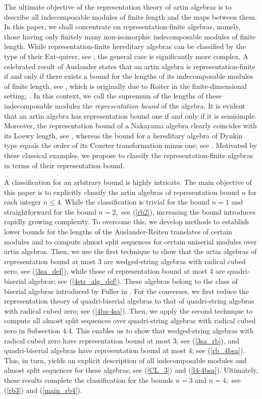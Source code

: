 \documentclass[10pt]{amsart}
\theoremstyle{definition}
\begin{document}
The ultimate objective of the representation theory of artin algebras is to describe all indecomposable modules of finite length and the maps between them. In this paper, we shall concentrate on representation-finite algebras, namely, those having only finitely many non-isomorphic indecomposable modules of finite length. While representation-finite hereditary algebras can be classified by the type of their Ext-quiver, see \cite{DR, Gab, LiT, PAu}, the general case is significantly more complex. A celebrated result of Auslander states that an artin algebra is representation-finite if and only if there exists a bound for the lengths of its indecomposable modules of finite length, see \cite{Aus}, which is originally due to Roiter in the finite-dimensional setting; \cite{Roi}. In this context, we call the supremum of the lengths of these indecomposable modules the {\it representation bound} of the algebra. It is evident that an artin algebra has representation bound one if and only if it is semisimple. Moreover, the representation bound of a Nakayama algebra clearly coincides with its Loewy length, see \cite{Nak}, whereas the bound for a hereditary algebra of Dynkin type equals the order of its Coxeter transformation minus one; see \cite[(4.9)]{Zac}. Motivated by these classical examples, we propose to classify the representation-finite algebras in terms of their representation bound. 

A classification for an arbitrary bound is highly intricate. The main objective of this paper is to explicitly classify the artin algebras of representation bound $n$ for each integer $n \le 4$. While the classification  is trivial for the bound $n=1$ and straightforward for the bound $n=2,$ see (\ref{rb2}), increasing the bound introduces rapidly growing complexity. To overcome this, we develop methods to establish lower bounds for the lengths of the Auslander-Reiten translates of certain modules and to compute almost split sequences for certain uniserial modules over artin algebras. Then, we use the first technique to show that the artin algebras of representation bound at most $3$ are wedged-string algebras with radical cubed zero, see (\ref{3sa_def}), while those of representation bound at most $4$ are quadri-biserial algebras; see (\ref{4str_alg_def}). These algebras belong to the class of biserial algebras introduced by Fuller in \cite{Ful}. For the converses, we first reduce the representation theory of quadri-biserial algebras to that of quadri-string algebras with radical cubed zero; see (\ref{4ba-4sa}). Then, we apply the second technique to compute all almost split sequences over quadri-string algebras with radical cubed zero in Subsection 4.4. This enables us to show that wedged-string algebras with radical cubed zero have representation bound at most $3$, see (\ref{3sa_rb}), and quadri-biserial algebras have representation bound at most $4$; see (\ref{rb_4bsa}). This, in turn, yields an explicit description of all indecomposable modules and almost split sequences for these algebras; see (\ref{CL_3}) and (\ref{l4-4bsa}). Ultimately, these results complete the classification for the bounds $n=3$ and $n=4;$ see (\ref{rb3}) and (\ref{main_rb4}).
\end{document}
